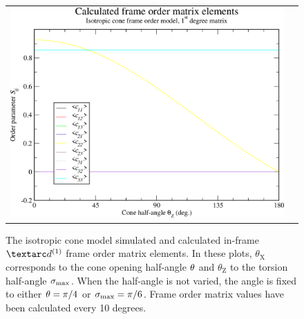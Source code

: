\begin{figure}
\begin{tabular}{@{}cc@{}}
    \includegraphics[width=.5\textwidth]{images/frame_order_matrix/Sij_iso_cone_in_frame_theta_z_calc.eps} \\
  \end{tabular}
  \caption[Isotropic cone simulated and calculated in-frame Daeg$^{(1)}$ elements.]{
    The isotropic cone model simulated and calculated in-frame $\FOone$ frame order matrix elements.
    In these plots, $\theta_\textrm{X}$ corresponds to the cone opening half-angle $\theta$ and $\theta_\textrm{Z}$ to the torsion half-angle $\sigma_\textrm{max}$.
    When the half-angle is not varied, the angle is fixed to either $\theta = \pi/4$ or $\sigma_\textrm{max} = \pi/6$.
    Frame order matrix values have been calculated every 10 degrees.
  }
  \label{fig: simulated and calculated in-frame 1st degree iso cone frame order}
\end{figure}

